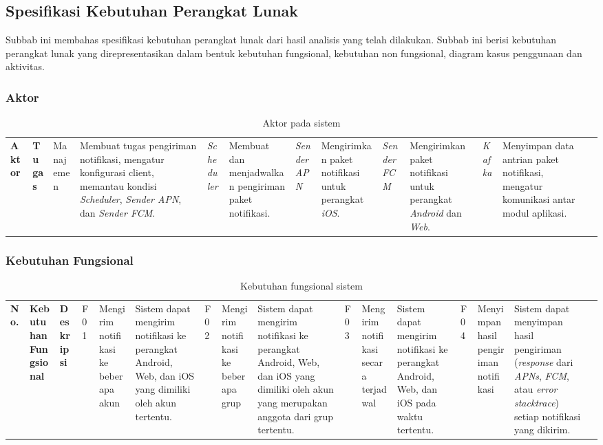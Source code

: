 \subsection{Spesifikasi Kebutuhan Perangkat Lunak}
Subbab ini membahas spesifikasi kebutuhan perangkat lunak dari hasil analisis yang telah dilakukan. Subbab ini berisi kebutuhan perangkat lunak yang direpresentasikan dalam bentuk kebutuhan fungsional, kebutuhan non fungsional, diagram kasus penggunaan dan aktivitas.

\subsubsection{Aktor}
\begin{longtable}{|p{2cm}|p{6cm}|}
    \hline
    \textbf{Aktor} & \textbf{Tugas} & \hline
    Manajemen &
    Membuat tugas pengiriman notifikasi, mengatur konfigurasi client, memantau kondisi \textit{Scheduler}, \textit{Sender APN}, dan \textit{Sender FCM}. & \hline
    \textit{Scheduler} & Membuat dan menjadwalkan pengiriman paket notifikasi. & \hline
    \textit{Sender APN} & Mengirimkan paket notifikasi untuk perangkat \textit{iOS}. & \hline
    \textit{Sender FCM} & Mengirimkan paket notifikasi untuk perangkat \textit{Android} dan \textit{Web}. & \hline
    \textit{Kafka} & Menyimpan data antrian paket notifikasi, mengatur komunikasi antar modul aplikasi. & \hline
    \caption{Aktor pada sistem}
\end{longtable}

\subsubsection{Kebutuhan Fungsional}
\begin{longtable}{|p{2cm}|p{2cm}|p{4cm}|}
    \hline
    \textbf{No.} & \textbf{Kebutuhan Fungsional} & \textbf{Deskripsi} & \hline
    F01 & Mengirim notifikasi ke beberapa akun & Sistem dapat mengirim notifikasi ke perangkat Android, Web, dan iOS yang dimiliki oleh akun tertentu. & \hline
    F02 & Mengirim notifikasi ke beberapa grup & Sistem dapat mengirim notifikasi ke perangkat Android, Web, dan iOS yang dimiliki oleh akun yang merupakan anggota dari grup tertentu. & \hline
    F03 & Mengirim notifikasi secara terjadwal & Sistem dapat mengirim notifikasi ke perangkat Android, Web, dan iOS pada waktu tertentu. & \hline
    F04 & Menyimpan hasil pengiriman notifikasi & Sistem dapat menyimpan hasil pengiriman (\textit{response} dari \textit{APNs}, \textit{FCM}, atau \textit{error stacktrace}) setiap notifikasi yang dikirim. & \hline
    \caption{Kebutuhan fungsional sistem}
\end{longtable}

